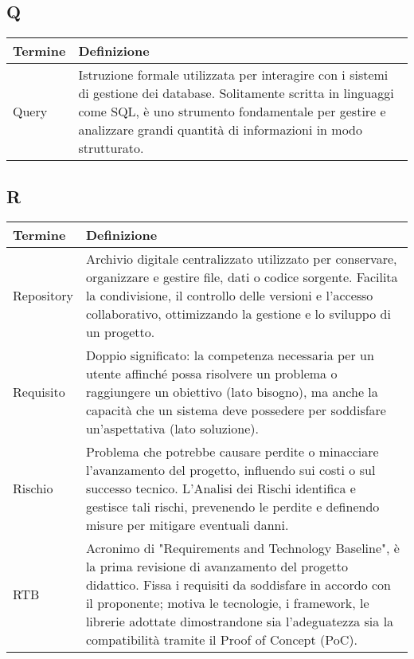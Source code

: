 \documentclass[10pt]{article}
\begin{document}
\subsection{Q} %
\begin{longtable}{|>{\centering\arraybackslash}m{2.5cm}|>{\arraybackslash}m{12.5cm}|}
\hline
\rowcolor[gray]{0.8}
\textbf{Termine} & \textbf{Definizione}\\
\endhead
\hline
Query & Istruzione formale utilizzata per interagire con i sistemi di gestione dei database. Solitamente scritta in linguaggi come SQL, è uno strumento fondamentale per gestire e analizzare grandi quantità di informazioni in modo strutturato.\\
\hline
\end{longtable}

\subsection{R} %
\begin{longtable}{|>{\centering\arraybackslash}m{2.5cm}|>{\arraybackslash}m{12.5cm}|}
\hline
\rowcolor[gray]{0.8}
\textbf{Termine} & \textbf{Definizione}\\
\endhead
\hline
Repository & Archivio digitale centralizzato utilizzato per conservare, organizzare e gestire file, dati o codice sorgente. Facilita la condivisione, il controllo delle versioni e l'accesso collaborativo, ottimizzando la gestione e lo sviluppo di un progetto.\\
\hline
Requisito & Doppio significato: la competenza necessaria per un utente affinché possa risolvere un problema o raggiungere un obiettivo (lato bisogno), ma anche la capacità che un sistema deve possedere per soddisfare un'aspettativa (lato soluzione).\\
\hline
Rischio & Problema che potrebbe causare perdite o minacciare l'avanzamento del progetto, influendo sui costi o sul successo tecnico. L'Analisi dei Rischi identifica e gestisce tali rischi, prevenendo le perdite e definendo misure per mitigare eventuali danni.\\
\hline
RTB & Acronimo di "Requirements and Technology Baseline", è la prima revisione di avanzamento del progetto didattico. Fissa i requisiti da soddisfare in accordo con il proponente; motiva le tecnologie, i framework, le librerie adottate dimostrandone sia l'adeguatezza sia la compatibilità tramite il Proof of Concept (PoC).\\
\hline
\end{longtable}
\end{document}
